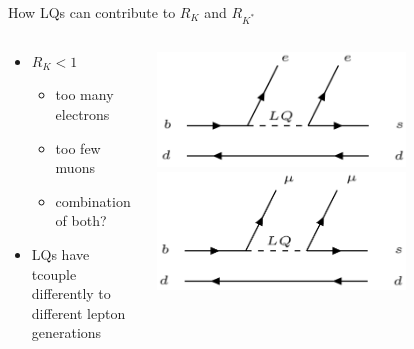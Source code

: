 \begin{frame}{How LQs can contribute to $R_{K}$ and $R_{K^*}$ }
    \begin{columns}
        \begin{column}{0.6\textwidth}
            \begin{itemize}
                \item $R_{K} < 1$
                \begin{itemize}
                    \item < 2-> too many electrons
                    \item < 2-> too few muons
                    \item < 2-> combination of both?
                \end{itemize}
                \item < 3->LQs have tcouple differently to different lepton generations
            \end{itemize}
        \end{column}
        \begin{column}{0.4\textwidth}
            \includegraphics[width=0.7\textwidth]{content/images/LQ_ee.png}
            \includegraphics[width=0.7\textwidth]{content/images/LQ_mumu.png}
        \end{column}
    \end{columns}
\end{frame}

